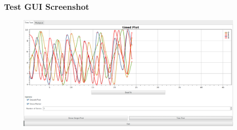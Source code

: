 \documentclass{beamer}
\begin{document}
\begin{frame}
 \frametitle{Test GUI Screenshot}
 \begin{figure}
  \centering
  \includegraphics[width=\textwidth,keepaspectratio=true]{./pics/ScreenshotPlot.png}
 \end{figure}
\end{frame}
\end{document}
